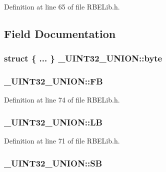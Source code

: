 Definition at line 65 of file R\+B\+E\+Lib.\+h.



\subsection{Field Documentation}
\hypertarget{union___u_i_n_t32___u_n_i_o_n_adfc039b253823821842a05d37a9690e3}{
\subsubsection[{byte}]{\setlength{\rightskip}{0pt plus 5cm}struct \{ ... \}   \+\_\+\+U\+I\+N\+T32\+\_\+\+U\+N\+I\+O\+N\+::byte}}\label{union___u_i_n_t32___u_n_i_o_n_adfc039b253823821842a05d37a9690e3}
\hypertarget{union___u_i_n_t32___u_n_i_o_n_a1c6a4ae906c3d72305edc761c57614b3}{
\subsubsection[{F\+B}]{ \+\_\+\+U\+I\+N\+T32\+\_\+\+U\+N\+I\+O\+N\+::\+F\+B}}\label{union___u_i_n_t32___u_n_i_o_n_a1c6a4ae906c3d72305edc761c57614b3}


Definition at line 74 of file R\+B\+E\+Lib.\+h.

\hypertarget{union___u_i_n_t32___u_n_i_o_n_a26a4ac8e62f96c793f49c63db79b7d30}{
\subsubsection[{L\+B}]{ \+\_\+\+U\+I\+N\+T32\+\_\+\+U\+N\+I\+O\+N\+::\+L\+B}}\label{union___u_i_n_t32___u_n_i_o_n_a26a4ac8e62f96c793f49c63db79b7d30}


Definition at line 71 of file R\+B\+E\+Lib.\+h.

\hypertarget{union___u_i_n_t32___u_n_i_o_n_a28f45401359a496faf9b5eceaec380af}{
\subsubsection[{S\+B}]{ \+\_\+\+U\+I\+N\+T32\+\_\+\+U\+N\+I\+O\+N\+::\+S\+B}}\label{union___u_i_n_t32___u_n_i_o_n_a28f45401359a496faf9b5eceaec380af}


